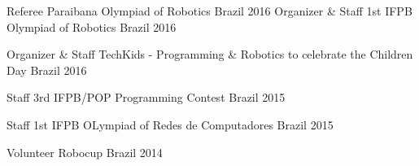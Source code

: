 

\begin{cvhonors}

  \cvhonor
    {Referee} %
    {Paraibana Olympiad of Robotics} %
    {Brazil} %
    {2016} %
  \cvhonor
    {Organizer \& Staff} %
    {1st IFPB Olympiad of Robotics} %
    {Brazil} %
    {2016} %

  \cvhonor
    {Organizer \& Staff} %
    {TechKids - Programming \& Robotics to celebrate the Children Day} %
    {Brazil} %
    {2016} %

  \cvhonor
    {Staff} %
    {3rd IFPB/POP Programming Contest} %
    {Brazil} %
    {2015} %
    
  \cvhonor
    {Staff} %
    {1st IFPB OLympiad of Redes de Computadores} %
    {Brazil} %
    {2015} %
    
  \cvhonor
    {Volunteer} %
    {Robocup} %
    {Brazil} %
    {2014} %

\end{cvhonors}
